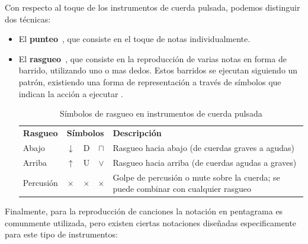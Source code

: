 Con respecto al toque de los instrumentos de cuerda pulsada, podemos distinguir dos técnicas:

\begin{itemize}
    \item El \textbf{\gls{punteo}}~\cite{wikipedia_punteo}, que consiste en el toque de notas individualmente.
    \item El \textbf{\gls{rasgueo}}~\cite{wikipedia_rasgueo}, que consiste en la reproducción de varias notas en forma de barrido, utilizando uno o mas dedos. Estos barridos se ejecutan siguiendo un patrón, existiendo una forma de representación a través de símbolos que indican la acción a ejecutar .
    \begin{table}[H]
        \centering
        \scriptsize
        \begin{tabular}{l c c c l}
            \hline
            \textbf{Rasgueo} & \multicolumn{3}{c}{\textbf{Símbolos}} & \textbf{Descripción} \\
            Abajo & $\downarrow$ & D & $\sqcap$ & Rasgueo hacia abajo (de cuerdas graves a agudas) \\
            Arriba & $\uparrow$ & U & $\vee$ & Rasgueo hacia arriba (de cuerdas agudas a graves) \\
            Percusión & $\times$ & $\times$ & $\times$ & Golpe de percusión o mute sobre la cuerda; se puede combinar con cualquier rasgueo \\
            \hline
        \end{tabular}
        \caption{Símbolos de rasgueo en instrumentos de cuerda pulsada}
        \label{tabla:simbolos_rasgueo}
    \end{table}
\end{itemize}

Finalmente, para la reproducción de canciones la notación en pentagrama es comunmente utilizada, pero existen ciertas notaciones diseñadas especificamente para este tipo de instrumentos:

